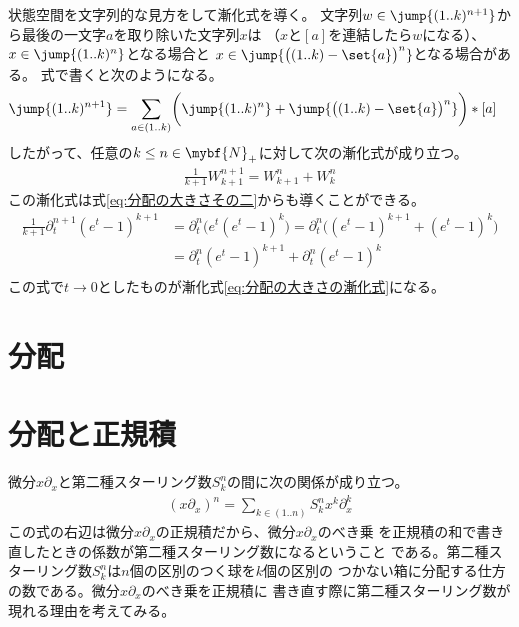 \begin{todo}[別の節を立てる]
	状態空間を文字列的な見方をして漸化式を導く。
	文字列$w\in\jump{(1..k)^{n+1}}$から最後の一文字$a$を取り除いた文字列$x$は
	（$x$と$[a]$を連結したら$w$になる）、$x\in\jump{(1..k)^n}$となる場合と
	$x\in\jump{\bigl((1..k)-\set{a}\bigr)^n}$となる場合がある。
	式で書くと次のようになる。
	\begin{equation*}\begin{split} %
		\jump{(1..k)^{n+1}} &= \sum_{a\in(1..k)}
			\biggl(\jump{(1..k)^n}
			+ \jump{\bigl((1..k)-\set{a}\bigr)^n}\biggr)*[a]
	\end{split}\end{equation*} %
	したがって、任意の$k\le n\in \mybf{N}_+$に対して次の漸化式が成り立つ。
	\begin{equation}\label{eq:分配の大きさの漸化式}\begin{split} %
		\frac{1}{k+1}W_{k+1}^{n+1} = W_{k+1}^n + W_k^n
	\end{split}\end{equation} %
	この漸化式は式\eqref{eq:分配の大きさその二}からも導くことができる。
	\begin{equation*}\begin{split} %
		\frac{1}{k+1}\partial_t^{n+1}(e^t-1)^{k+1}
		&= \partial_t^n\biggl(e^t(e^t-1)^k\biggr)
		= \partial_t^n\biggl((e^t-1)^{k+1}+(e^t-1)^k\biggr) \\
		&= \partial_t^n(e^t-1)^{k+1}+\partial_t^n(e^t-1)^k \\
	\end{split}\end{equation*} %
	この式で$t\to0$としたものが漸化式\eqref{eq:分配の大きさの漸化式}になる。
\end{todo} %

\section{分配}\label{s1:分配} %

\section{分配と正規積}\label{s1:分配と正規積} %
微分$x\partial_x$と第二種スターリング数$S_k^n$の間に次の関係が成り立つ。
\begin{equation*}\begin{split} %
	(x\partial_x)^n = \sum_{k\in(1..n)}S_k^nx^k\partial_x^k
\end{split}\end{equation*} %
この式の右辺は微分$x\partial_x$の正規積だから、微分$x\partial_x$のべき乗
を正規積の和で書き直したときの係数が第二種スターリング数になるということ
である。第二種スターリング数$S_k^n$は$n$個の区別のつく球を$k$個の区別の
つかない箱に分配する仕方の数である。微分$x\partial_x$のべき乗を正規積に
書き直す際に第二種スターリング数が現れる理由を考えてみる。

